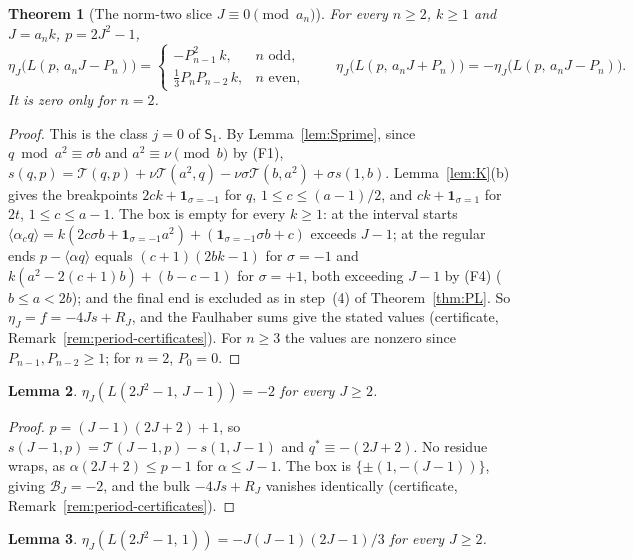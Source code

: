 \documentclass[11pt]{article}
\newtheorem{theorem}{Theorem}[section]
\newtheorem{lemma}[theorem]{Lemma}
\theoremstyle{definition}
\newcommand{\ind}{\mathbf 1}
\begin{document}
\begin{theorem}[The norm-two slice $J\equiv0\pmod{a_n}$]
\label{thm:Q}
For every $n\geq2$, $k\geq1$ and $J=a_nk$, $p=2J^2-1$,
\[
 \eta_J\bigl(L(p,\,a_nJ-P_n)\bigr)=
 \begin{cases}-P_{n-1}^2\,k,&n\text{ odd},\\[2pt]
 \tfrac13P_nP_{n-2}\,k,&n\text{ even},\end{cases}
 \qquad
 \eta_J\bigl(L(p,\,a_nJ+P_n)\bigr)=-\eta_J\bigl(L(p,\,a_nJ-P_n)\bigr).
\]
It is zero only for $n=2$.
\end{theorem}

\begin{proof}
This is the class $j=0$ of $\mathsf S_1$.  By Lemma~\ref{lem:Sprime},
since $q\bmod a^2\equiv\sigma b$ and $a^2\equiv\nu\pmod b$ by (F1),
$s(q,p)=\mathcal T(q,p)+\nu\mathcal T(a^2,q)-\nu\sigma\mathcal T(b,a^2)+\sigma s(1,b)$.
Lemma~\ref{lem:K}(b) gives the breakpoints $2ck+\ind_{\sigma=-1}$ for
$q$, $1\leq c\leq(a-1)/2$, and $ck+\ind_{\sigma=1}$ for $2t$,
$1\leq c\leq a-1$.  The box is empty for every $k\geq1$: at the interval
starts $\langle\alpha_cq\rangle=k(2c\sigma b+\ind_{\sigma=-1}a^2)+(\ind_{\sigma=-1}\sigma b+c)$
exceeds $J-1$; at the regular ends $p-\langle\alpha q\rangle$ equals
$(c+1)(2bk-1)$ for $\sigma=-1$ and $k(a^2-2(c+1)b)+(b-c-1)$ for
$\sigma=+1$, both exceeding $J-1$ by (F4) ($b\leq a<2b$); and the final
end is excluded as in step~(4) of Theorem~\ref{thm:PL}.  So
$\eta_J=f=-4Js+R_J$, and the Faulhaber sums give the stated values
(certificate, Remark~\ref{rem:period-certificates}).  For $n\geq3$ the
values are nonzero since $P_{n-1},P_{n-2}\geq1$; for $n=2$, $P_0=0$.
\end{proof}

\begin{lemma}
\label{lem:N}
$\eta_J(L(2J^2-1,\,J-1))=-2$ for every $J\geq2$.
\end{lemma}

\begin{proof}
$p=(J-1)(2J+2)+1$, so $s(J-1,p)=\mathcal T(J-1,p)-s(1,J-1)$ and
$q^*\equiv-(2J+2)$.  No residue wraps, as $\alpha(2J+2)\leq p-1$ for
$\alpha\leq J-1$.  The box is $\{\pm(1,-(J-1))\}$, giving
$\mathcal B_J=-2$, and the bulk $-4Js+R_J$ vanishes identically
(certificate, Remark~\ref{rem:period-certificates}).
\end{proof}

\begin{lemma}
\label{lem:N0}
$\eta_J(L(2J^2-1,\,1))=-J(J-1)(2J-1)/3$ for every $J\geq2$.
\end{lemma}
\end{document}
